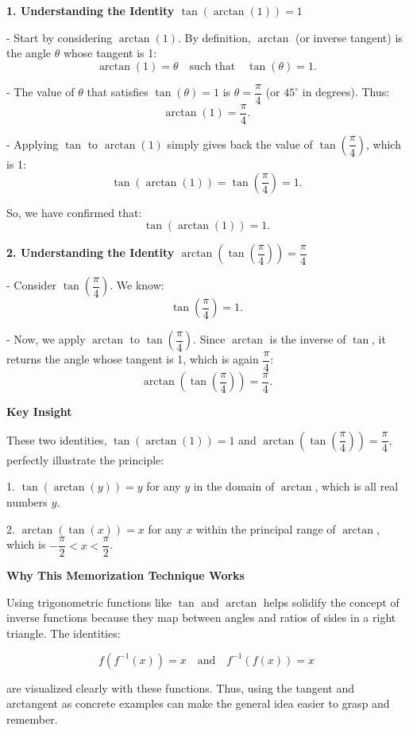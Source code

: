\documentclass[a4paper,12pt]{book}
\begin{document}
\textbf{1. Understanding the Identity \( \tan(\arctan(1)) = 1 \)}

- Start by considering \( \arctan(1) \). By definition, \( \arctan \) (or inverse tangent) is the angle \(\theta\) whose tangent is 1:
\[
\arctan(1) = \theta \quad \text{such that} \quad \tan(\theta) = 1.
\]

- The value of \(\theta\) that satisfies \( \tan(\theta) = 1 \) is \( \theta = \dfrac{\pi}{4} \) (or \( 45^\circ \) in degrees). Thus:
\[
\arctan(1) = \dfrac{\pi}{4}.
\]

- Applying \( \tan \) to \( \arctan(1) \) simply gives back the value of \( \tan(\dfrac{\pi}{4}) \), which is 1:
\[
\tan(\arctan(1)) = \tan\left(\dfrac{\pi}{4}\right) = 1.
\]

So, we have confirmed that:
\[
\tan(\arctan(1)) = 1.
\]

\textbf{2. Understanding the Identity \( \arctan(\tan(\dfrac{\pi}{4})) = \dfrac{\pi}{4} \)}

- Consider \( \tan(\dfrac{\pi}{4}) \). We know:
\[
\tan\left(\dfrac{\pi}{4}\right) = 1.
\]

- Now, we apply \( \arctan \) to \( \tan(\dfrac{\pi}{4}) \). Since \( \arctan \) is the inverse of \( \tan \), it returns the angle whose tangent is 1, which is again \( \dfrac{\pi}{4} \):
\[
\arctan(\tan(\dfrac{\pi}{4})) = \dfrac{\pi}{4}.
\]

\textbf{Key Insight}

These two identities, \( \tan(\arctan(1)) = 1 \) and \( \arctan(\tan(\dfrac{\pi}{4})) = \dfrac{\pi}{4} \), perfectly illustrate the principle:

1. \textbf{\( \tan(\arctan(y)) = y \)} for any \( y \) in the domain of \( \arctan \), which is all real numbers \( y \).

2. \textbf{\( \arctan(\tan(x)) = x \)} for any \( x \) within the principal range of \( \arctan \), which is \( -\dfrac{\pi}{2} < x < \dfrac{\pi}{2} \).

\textbf{Why This Memorization Technique Works}

Using trigonometric functions like \( \tan \) and \( \arctan \) helps solidify the concept of inverse functions because they map between angles and ratios of sides in a right triangle. The identities:

\[
f(f^{-1}(x)) = x \quad \text{and} \quad f^{-1}(f(x)) = x
\]

are visualized clearly with these functions. Thus, using the tangent and arctangent as concrete examples can make the general idea easier to grasp and remember.
\end{document}
